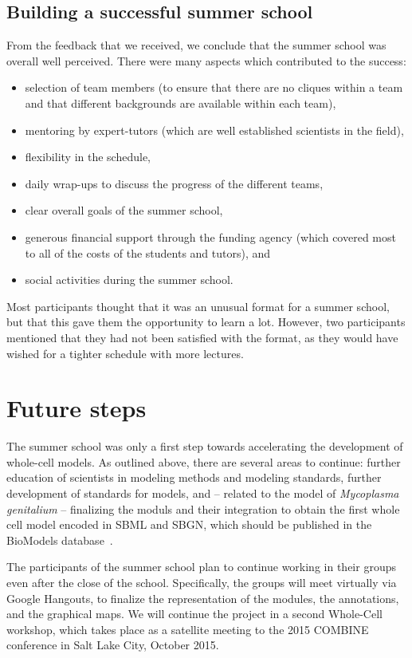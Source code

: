 \documentclass[journal,transmag]{IEEEtran}
\begin{document}
\subsection{Building a successful summer school}
From the feedback that we received, we conclude that the summer school was overall well perceived. 
There were many aspects which contributed to the success: 
\begin{itemize}
\item selection of team members (to ensure that there are no cliques within a team and that different backgrounds are available within each team), 
\item mentoring by expert-tutors (which are well established scientists in the field), 
\item flexibility in the schedule, 
\item daily wrap-ups to discuss the progress of the different teams, 
\item clear overall goals of the summer school,
\item generous financial support through the funding agency (which covered most to all of the costs of the students and tutors), and 
\item social activities during the summer school.
\end{itemize}
Most participants thought that it was an unusual format for  a summer school, but that this gave them the opportunity to learn a lot. 
However, two participants mentioned that they had not been satisfied with the format, as they would have wished for a tighter schedule with more lectures. 

\section{Future steps}

The summer school was only a first step towards accelerating the development of whole-cell models. 
As outlined above, there are several areas to continue: further education of scientists in modeling methods and modeling standards, further development of standards for models, and -- related to the model of \textit{Mycoplasma genitalium} -- finalizing the moduls and their integration to obtain the first whole cell model encoded in SBML and SBGN, which should be published in the BioModels database~\cite{li2010biomodels}. 

The participants of the summer school plan to continue working in their  groups even after the close of the school. 
Specifically, the groups will meet virtually via Google Hangouts, to finalize the representation of the modules, the annotations, and the graphical maps. 
We will continue the project in a second Whole-Cell workshop, which takes place as a satellite meeting to the 2015 COMBINE conference in Salt Lake City, October 2015.
\end{document}
